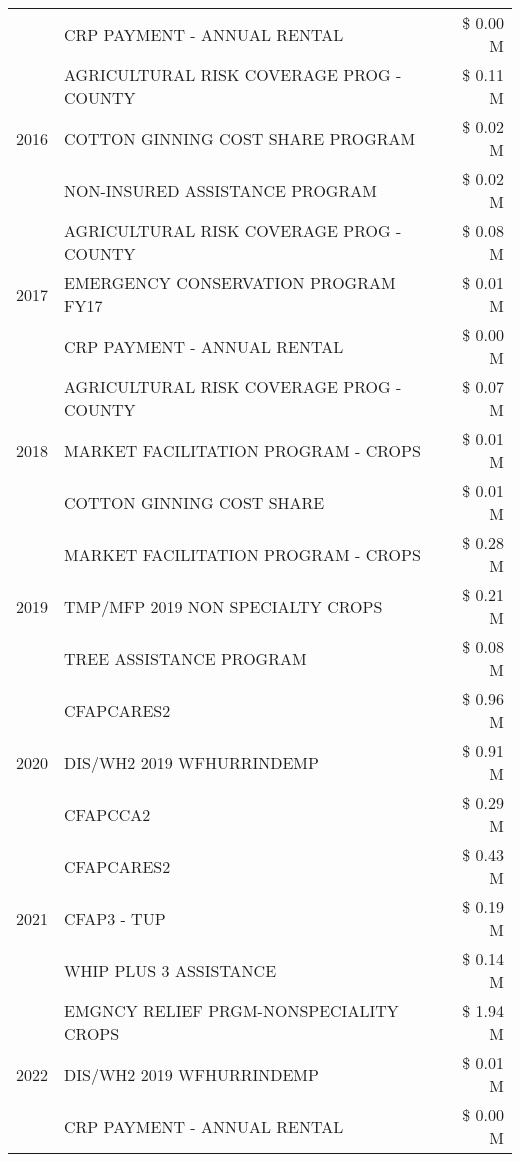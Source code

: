 \begin{tabular}{llr}
 & CRP PAYMENT - ANNUAL RENTAL & \$ 0.00 M \\
\cline{1-3}
\multirow[t]{3}{*}{2016} & AGRICULTURAL RISK COVERAGE PROG - COUNTY & \$ 0.11 M \\
 & COTTON GINNING COST SHARE PROGRAM & \$ 0.02 M \\
 & NON-INSURED ASSISTANCE PROGRAM & \$ 0.02 M \\
\cline{1-3}
\multirow[t]{3}{*}{2017} & AGRICULTURAL RISK COVERAGE PROG - COUNTY & \$ 0.08 M \\
 & EMERGENCY CONSERVATION PROGRAM FY17 & \$ 0.01 M \\
 & CRP PAYMENT - ANNUAL RENTAL & \$ 0.00 M \\
\cline{1-3}
\multirow[t]{3}{*}{2018} & AGRICULTURAL RISK COVERAGE PROG - COUNTY & \$ 0.07 M \\
 & MARKET FACILITATION PROGRAM - CROPS & \$ 0.01 M \\
 & COTTON GINNING COST SHARE & \$ 0.01 M \\
\cline{1-3}
\multirow[t]{3}{*}{2019} & MARKET FACILITATION PROGRAM - CROPS & \$ 0.28 M \\
 & TMP/MFP 2019 NON SPECIALTY CROPS & \$ 0.21 M \\
 & TREE ASSISTANCE PROGRAM & \$ 0.08 M \\
\cline{1-3}
\multirow[t]{3}{*}{2020} & CFAPCARES2 & \$ 0.96 M \\
 & DIS/WH2 2019 WFHURRINDEMP & \$ 0.91 M \\
 & CFAPCCA2 & \$ 0.29 M \\
\cline{1-3}
\multirow[t]{3}{*}{2021} & CFAPCARES2 & \$ 0.43 M \\
 & CFAP3 - TUP & \$ 0.19 M \\
 & WHIP PLUS 3 ASSISTANCE & \$ 0.14 M \\
\cline{1-3}
\multirow[t]{3}{*}{2022} & EMGNCY RELIEF PRGM-NONSPECIALITY CROPS & \$ 1.94 M \\
 & DIS/WH2 2019 WFHURRINDEMP & \$ 0.01 M \\
 & CRP PAYMENT - ANNUAL RENTAL & \$ 0.00 M \\
\cline{1-3}
\bottomrule
\end{tabular}
